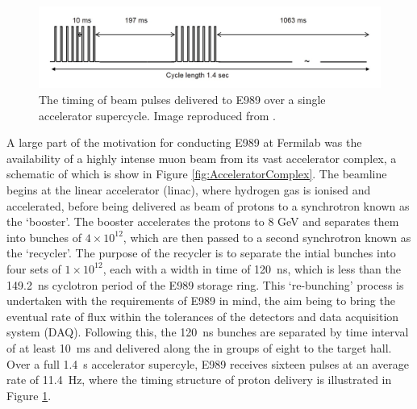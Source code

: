 \begin{figure}[t!]
\centering{}
\includegraphics[trim={0 0 0 0},clip,width=.89\textwidth]{Images/Chapter3/TimingStructure.png}
\caption{The timing of beam pulses delivered to E989 over a single accelerator supercycle. Image reproduced from \cite{TDR}.}
\label{fig:TimingStructure}
\end{figure}

A large part of the motivation for conducting E989 at Fermilab was the availability of a highly intense muon beam from its vast accelerator complex, a schematic of which is show in Figure \ref{fig:AcceleratorComplex}. The beamline begins at the linear accelerator (linac), where hydrogen gas is ionised and accelerated, before being delivered as beam of protons to a synchrotron known as the `booster'. The booster accelerates the protons to 8 GeV and separates them into bunches of $4\times10^{12}$, which are then passed to a second synchrotron known as the `recycler'. The purpose of the recycler is to separate the intial bunches into four sets of $1\times10^{12}$, each with a width in time of \SI{120}{\nano\second}, which is less than the \SI{149.2}{\nano\second} cyclotron period of the E989 storage ring. This `re-bunching' process is undertaken with the requirements of E989 in mind, the aim being to bring the eventual rate of flux within the tolerances of the detectors and data acquisition system (DAQ). Following this, the \SI{120}{\nano\second} bunches are separated by time interval of at least \SI{10}{\milli\second} and delivered along the in groups of eight to the target hall. Over a full \SI{1.4}{\second} accelerator supercyle, E989 receives sixteen pulses at an average rate of \SI{11.4}{\hertz}, where the timing structure of proton delivery is illustrated in Figure \ref{fig:TimingStructure}. 

